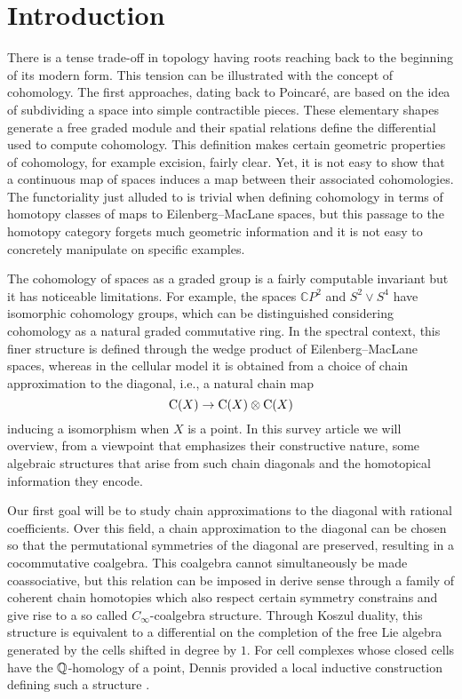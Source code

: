 
\section{Introduction} \label{s:introduction}

There is a tense trade-off in topology having roots reaching back to the beginning of its modern form.
This tension can be illustrated with the concept of cohomology.
The first approaches, dating back to Poincar\'e, are based on the idea of subdividing a space into simple contractible pieces.
These elementary shapes generate a free graded module and their spatial relations define the differential used to compute cohomology.
This definition makes certain geometric properties of cohomology, for example excision, fairly clear.
Yet, it is not easy to show that a continuous map of spaces induces a map between their associated cohomologies.
The functoriality just alluded to is trivial when defining cohomology in terms of homotopy classes of maps to Eilenberg--MacLane spaces, but this passage to the homotopy category forgets much geometric information and it is not easy to concretely manipulate on specific examples.

The cohomology of spaces as a graded group is a fairly computable invariant but it has noticeable limitations.
For example, the spaces $\mathbb{C} P^2$ and $S^2 \vee S^4$ have isomorphic cohomology groups, which can be distinguished considering cohomology as a natural graded commutative ring.
In the spectral context, this finer structure is defined through the wedge product of Eilenberg--MacLane spaces, whereas in the cellular model it is obtained from a choice of chain approximation to the diagonal, i.e., a natural chain map
\[
\operatorname{C}(X) \to \operatorname{C}(X) \otimes \operatorname{C}(X)
\]
inducing a isomorphism when $X$ is a point.
In this survey article we will overview, from a viewpoint that emphasizes their constructive nature, some algebraic structures that arise from such chain diagonals and the homotopical information they encode.

Our first goal will be to study chain approximations to the diagonal with rational coefficients.
Over this field, a chain approximation to the diagonal can be chosen so that the permutational symmetries of the diagonal are preserved, resulting in a cocommutative coalgebra.
This coalgebra cannot simultaneously be made coassociative, but
this relation can be imposed in derive sense through a family of coherent chain homotopies which also respect certain symmetry constrains and give rise to a so called $C_\infty$-coalgebra structure.
Through Koszul duality, this structure is equivalent to a differential on the completion of the free Lie algebra generated by the cells shifted in degree by $1$.
For cell complexes whose closed cells have the $\mathbb{Q}$-homology of a point, Dennis provided a local inductive construction defining such a structure \cite{sullivan2007appendix}.

